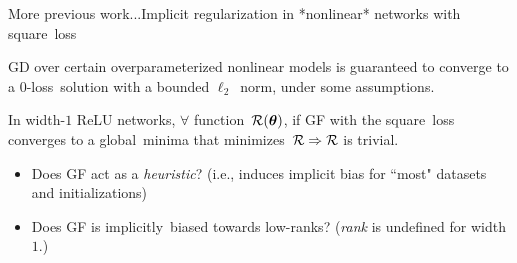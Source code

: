 \documentclass[handout,usenames,dvipsnames]{beamer} %
\newcommand{\btheta}{{\boldsymbol{\theta}}}
\newcommand{\calr}{{\cal R}}
\begin{document}
\begin{frame}{More previous work...}{Implicit regularization in *nonlinear* networks with square~loss}
    \pause
    \begin{block}{\cite{oymak2019overparameterized}}
         GD over certain overparameterized nonlinear models is guaranteed to converge to a 0-loss~solution with a bounded $\ell_2$~norm, under some assumptions.
    \end{block}
    \pause
    \begin{block}{\cite{vardi2021implicit}}
         In width-$1$ ReLU networks, $\forall$ function~$\calr(\btheta)$, if  GF with the square~loss converges to a global~minima that minimizes~$\calr \Rightarrow \calr$ is \alert{trivial}.
    \end{block}
    \pause
    \begin{itemize}
        \item Does GF act as a \emph{heuristic}? (i.e., induces implicit bias for ``most" datasets and initializations)
        \pause
        \item Does GF is implicitly~biased towards low-ranks? (\emph{rank} is undefined for width $1$.)
    \end{itemize}
    

\end{frame}
\end{document}
